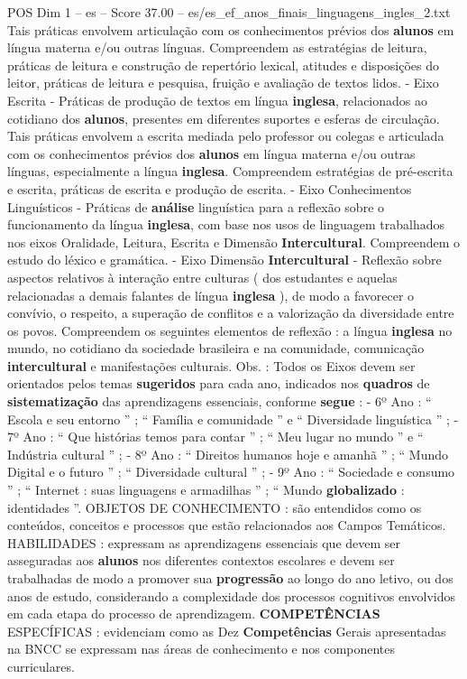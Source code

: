 \begin{textsample}{POS Dim 1 – es – Score 37.00 – es/es\_ef\_anos\_finais\_linguagens\_ingles\_2.txt}
Tais práticas envolvem articulação com os conhecimentos prévios dos \textbf{alunos} em língua materna e/ou outras línguas.
Compreendem as estratégias de leitura, práticas de leitura e construção de repertório lexical, atitudes e disposições do leitor, práticas de leitura e pesquisa, fruição e avaliação de textos lidos. - Eixo Escrita - Práticas de produção de textos em língua \textbf{inglesa}, relacionados ao cotidiano dos \textbf{alunos}, presentes em diferentes suportes e esferas de circulação.
Tais práticas envolvem a escrita mediada pelo professor ou colegas e articulada com os conhecimentos prévios dos \textbf{alunos} em língua materna e/ou outras línguas, especialmente a língua \textbf{inglesa}.
Compreendem estratégias de pré-escrita e escrita, práticas de escrita e produção de escrita. - Eixo Conhecimentos Linguísticos - Práticas de \textbf{análise} linguística para a reflexão sobre o funcionamento da língua \textbf{inglesa}, com base nos usos de linguagem trabalhados nos eixos Oralidade, Leitura, Escrita e Dimensão \textbf{Intercultural}.
Compreendem o estudo do léxico e gramática. - Eixo Dimensão \textbf{Intercultural} - Reflexão sobre aspectos relativos à interação entre culturas ( dos estudantes e aquelas relacionadas a demais falantes de língua \textbf{inglesa} ), de modo a favorecer o convívio, o respeito, a superação de conflitos e a valorização da diversidade entre os povos.
Compreendem os seguintes elementos de reflexão : a língua \textbf{inglesa} no mundo, no cotidiano da sociedade brasileira e na comunidade, comunicação \textbf{intercultural} e manifestações culturais.
Obs. : Todos os Eixos devem ser orientados pelos temas \textbf{sugeridos} para cada ano, indicados nos \textbf{quadros} de \textbf{sistematização} das aprendizagens essenciais, conforme \textbf{segue} : - 6º Ano : “ Escola e seu entorno ” ; “ Família e comunidade ” e “ Diversidade linguística ” ; - 7º Ano : “ Que histórias temos para contar ” ; “ Meu lugar no mundo ” e “ Indústria cultural ” ; - 8º Ano : “ Direitos humanos hoje e amanhã ” ; “ Mundo Digital e o futuro ” ; “ Diversidade cultural ” ; - 9º Ano : “ Sociedade e consumo ” ; “ Internet : suas linguagens e armadilhas ” ; “ Mundo \textbf{globalizado} : identidades ”.
OBJETOS DE CONHECIMENTO : são entendidos como os conteúdos, conceitos e processos que estão relacionados aos Campos Temáticos.
HABILIDADES : expressam as aprendizagens essenciais que devem ser asseguradas aos \textbf{alunos} nos diferentes contextos escolares e devem ser trabalhadas de modo a promover sua \textbf{progressão} ao longo do ano letivo, ou dos anos de estudo, considerando a complexidade dos processos cognitivos envolvidos em cada etapa do processo de aprendizagem. \textbf{COMPETÊNCIAS} ESPECÍFICAS : evidenciam como as Dez \textbf{Competências} Gerais apresentadas na BNCC se expressam nas áreas de conhecimento e nos componentes curriculares.

\end{textsample}
